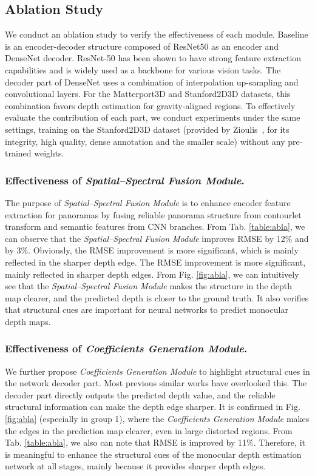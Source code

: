 \documentclass[10pt,times,mathptm,psfig,twocolumn,journals]{IEEEtran}
\begin{document}
 \subsection{Ablation Study}
 \label{abla}
 We conduct an ablation study to verify the effectiveness of each module. Baseline is an encoder-decoder structure composed of ResNet50 as an encoder and DenseNet decoder. ResNet-50 has been shown to have strong feature extraction capabilities and is widely used as a backbone for various vision tasks. The decoder part of DenseNet uses a combination of interpolation up-sampling and convolutional layers. For the Matterport3D and Stanford2D3D datasets, this combination favors depth estimation for gravity-aligned regions. To effectively evaluate the contribution of each part, we conduct experiments under the same settings, training on the Stanford2D3D dataset (provided by Zioulis~\cite{zioulis2018omnidepth}, for its integrity, high quality, dense annotation and the smaller scale) without any pre-trained weights.


\subsubsection{Effectiveness of \textit{Spatial–Spectral Fusion Module}.} The purpose of \textit{Spatial–Spectral Fusion Module} is to enhance encoder feature extraction for panoramas by fusing reliable panorama structure from contourlet transform and semantic features from CNN branches. From Tab. \ref{table:abla}, we can observe that the \textit{Spatial–Spectral Fusion Module} improves RMSE by 12\% and  by 3\%. Obviously, the RMSE improvement is more significant, which is mainly reflected in the sharper depth edge. The RMSE improvement is more significant, mainly reflected in sharper depth edges. From Fig. \ref{fig:abla}, we can intuitively see that the \textit{Spatial–Spectral Fusion Module}  makes the structure in the depth map clearer, and the predicted depth is closer to the ground truth. It also verifies that structural cues are important for neural networks to predict monocular depth maps.
\subsubsection{Effectiveness of \textit{Coefficients Generation Module}.} We further propose \textit{Coefficients Generation Module} to highlight structural cues in the network decoder part. Most previous similar works have overlooked this. The decoder part directly outputs the predicted depth value, and the reliable structural information can make the depth edge sharper. It is confirmed in Fig. \ref{fig:abla} (especially in group 1), where the \textit{Coefficients Generation Module} makes the edges in the prediction map clearer, even in large distorted regions. From Tab. \ref{table:abla}, we also can note that RMSE is improved by 11\%. Therefore, it is meaningful to enhance the structural cues of the monocular depth estimation network at all stages, mainly because it provides sharper depth edges.
\end{document}
